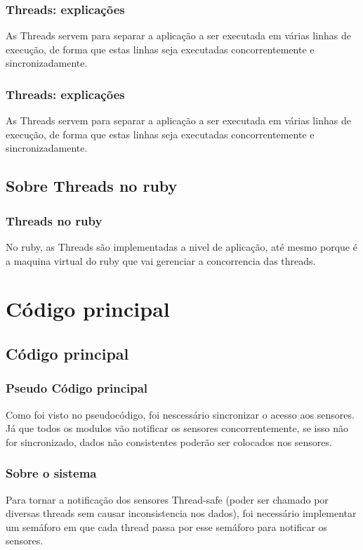 	\begin{frame}
	\frametitle{Threads: explicações}
		 \begin{block}{}
				As Threads servem para separar a aplicação a ser executada em várias linhas de execução, de forma que estas linhas seja executadas concorrentemente e sincronizadamente.
		 \end{block}
	\end{frame}
	\begin{frame}
	\frametitle{Threads: explicações}
		 \begin{block}{}
				As Threads servem para separar a aplicação a ser executada em várias linhas de execução, de forma que estas linhas seja executadas concorrentemente e sincronizadamente.
		 \end{block}
	\end{frame}

	\subsection{Sobre Threads no ruby}
	\begin{frame}
	\frametitle{Threads no ruby}
		 \begin{block}{}
				No ruby, as Threads  são implementadas a nivel de aplicação, até mesmo porque é a maquina virtual do ruby que vai gerenciar a concorrencia das threads.
		 \end{block}
	\end{frame}

\section{Código principal}
	\subsection{Código principal}
	\begin{frame}
	\frametitle{Pseudo Código principal}
		 \begin{block}{}
				Como foi visto no  pseudocódigo, foi nescessário sincronizar o acesso aos sensores. Já que todos os modulos vão notificar os sensores concorrentemente, se isso não for sincronizado, dados não consistentes poderão ser colocados nos sensores.
		 \end{block}
	\end{frame}

	\begin{frame}
	\frametitle{Sobre o sistema}
		 \begin{block}{}
				Para tornar a notificação dos sensores Thread-safe (poder ser chamado por diversas threads sem causar inconsistencia nos dados), foi necessário implementar um semáforo em que cada thread passa por esse semáforo para notificar os sensores.
		 \end{block}
	\end{frame}

